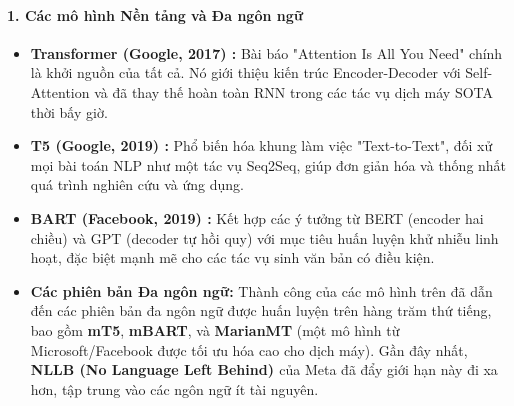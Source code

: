 \paragraph{1. Các mô hình Nền tảng và Đa ngôn ngữ}
\begin{itemize}
    \item \textbf{Transformer (Google, 2017) \cite{vaswani2017attention}:} Bài báo "Attention Is All You Need" chính là khởi nguồn của tất cả. Nó giới thiệu kiến trúc Encoder-Decoder với Self-Attention và đã thay thế hoàn toàn RNN trong các tác vụ dịch máy SOTA thời bấy giờ.
    \item \textbf{T5 (Google, 2019) \cite{raffel2020exploring}:} Phổ biến hóa khung làm việc "Text-to-Text", đối xử mọi bài toán NLP như một tác vụ Seq2Seq, giúp đơn giản hóa và thống nhất quá trình nghiên cứu và ứng dụng.
    \item \textbf{BART (Facebook, 2019) \cite{lewis2019bart}:} Kết hợp các ý tưởng từ BERT (encoder hai chiều) và GPT (decoder tự hồi quy) với mục tiêu huấn luyện khử nhiễu linh hoạt, đặc biệt mạnh mẽ cho các tác vụ sinh văn bản có điều kiện.
    \item \textbf{Các phiên bản Đa ngôn ngữ:} Thành công của các mô hình trên đã dẫn đến các phiên bản đa ngôn ngữ được huấn luyện trên hàng trăm thứ tiếng, bao gồm \textbf{mT5}, \textbf{mBART}, và \textbf{MarianMT} (một mô hình từ Microsoft/Facebook được tối ưu hóa cao cho dịch máy). Gần đây nhất, \textbf{NLLB (No Language Left Behind) \cite{costa2022no}} của Meta đã đẩy giới hạn này đi xa hơn, tập trung vào các ngôn ngữ ít tài nguyên.
\end{itemize}

